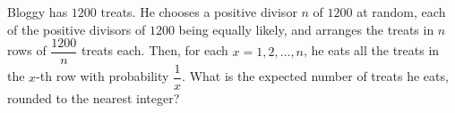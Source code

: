 Bloggy has $1200$ treats. He chooses a positive divisor $n$ of $1200$ at random, each of the positive divisors of $1200$ being equally likely, and arranges the treats in $n$ rows of $\dfrac{1200}{n}$ treats each. Then, for each $x=1,2,\dots,n$, he eats all the treats in the $x$-th row with probability $\dfrac1x$. What is the expected number of treats he eats, rounded to the nearest integer?
